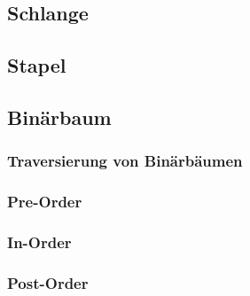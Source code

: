 \subsection{Schlange}
\subsection{Stapel}
\subsection{Binärbaum}
\subsubsection{Traversierung von Binärbäumen}
\subsubsection*{Pre-Order}
\subsubsection*{In-Order}
\subsubsection*{Post-Order}

